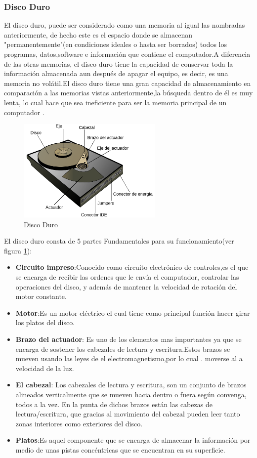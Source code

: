 \documentclass{article}
\begin{document}
\subsubsection{Disco Duro}
El disco duro, puede ser considerado como una memoria al igual las nombradas anteriormente, de hecho este es el espacio donde se almacenan "permanentemente"(en condiciones ideales o hasta ser borrados) todos los programas, datos,software e información que contiene el computador.A diferencia de las otras memorias, el disco duro tiene la capacidad de conservar toda la información almacenada aun después de apagar el equipo, es decir, es una memoria no volátil.El disco duro tiene una gran capacidad de almacenamiento en comparación a las memorias vistas anteriormente,la búsqueda dentro de él es muy lenta, lo cual hace que sea ineficiente para ser la memoria principal de un computador \cite{disco}.

\begin{figure}[h]
\includegraphics[width=7cm]{HDD.png}
\centering
\caption{Disco Duro}
\label{hdd}
\end{figure}

El disco duro consta de 5 partes Fundamentales para su funcionamiento(ver figura \ref{hdd}):

\begin{itemize}
    \item \textbf{Circuito impreso}:Conocido como circuito electrónico de controles,es el que se encarga de recibir las ordenes que le envía el computador, controlar  las operaciones del disco, y además de mantener la velocidad de rotación del motor constante.
    \item \textbf{Motor}:Es un motor eléctrico el cual tiene como principal función hacer girar los platos del disco.
    \item \textbf{Brazo del actuador}: Es uno de los elementos mas importantes ya que se encarga de sostener los cabezales de lectura y escritura.Estos brazos se mueven usando las leyes de el electromagnetismo,por lo cual . moverse al a velocidad de la luz.
    \item \textbf{El cabezal}: Los cabezales  de lectura y escritura, son un conjunto de brazos alineados verticalmente que se mueven hacia dentro o fuera según convenga, todos a la vez. En la punta de dichos brazos están las cabezas de lectura/escritura, que gracias al movimiento del cabezal pueden leer tanto zonas interiores como exteriores del disco.
    \item \textbf{Platos}:Es aquel componente que se encarga de almacenar la información por medio de unas pistas concéntricas que se encuentran en su superficie.
\end{itemize}
\end{document}
